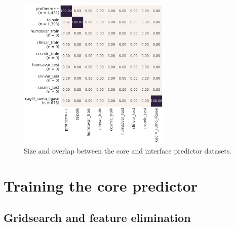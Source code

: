 \begin{figure}[ht!]
	\centering
	\includegraphics[width=0.65\textwidth]{static/elaspic_training_set/data_statistics/training_set_overlap_data_df_core.pdf}
	\caption{Size and overlap between the core and interface predictor datasets.}
\end{figure}



\section{Training the core predictor}

\subsection{Gridsearch and feature elimination}

